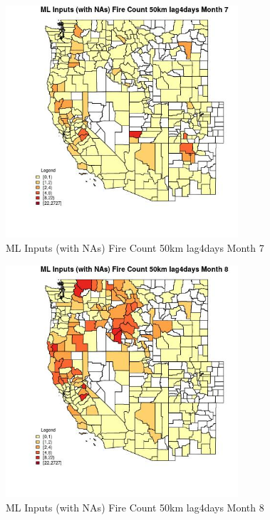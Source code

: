 \clearpage 

\begin{figure} 
\centering  
\includegraphics[width=0.77\textwidth]{Code_Outputs/Report_ML_input_PM25_Step4_part_f_de_duplicated_aves_prioritize_24hr_obswNAs_CountyFire_Count_50km_lag4daysmedianMonth7.jpg} 
\caption{\label{fig:Report_ML_input_PM25_Step4_part_f_de_duplicated_aves_prioritize_24hr_obswNAsCountyFire_Count_50km_lag4daysmedianMonth7}ML Inputs (with NAs) Fire Count 50km lag4days Month 7} 
\end{figure} 
 

\begin{figure} 
\centering  
\includegraphics[width=0.77\textwidth]{Code_Outputs/Report_ML_input_PM25_Step4_part_f_de_duplicated_aves_prioritize_24hr_obswNAs_CountyFire_Count_50km_lag4daysmedianMonth8.jpg} 
\caption{\label{fig:Report_ML_input_PM25_Step4_part_f_de_duplicated_aves_prioritize_24hr_obswNAsCountyFire_Count_50km_lag4daysmedianMonth8}ML Inputs (with NAs) Fire Count 50km lag4days Month 8} 
\end{figure} 
 

